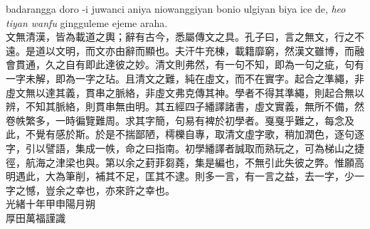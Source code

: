 \documentclass{article}
\begin{document}
\noindent badarangga doro -i juwanci aniya niowanggiyan bonio ulgiyan biya ice de, \emph{heo tiyan wanfu} gingguleme ejeme araha.\\

文無清漢，皆為載道之輿；辭有古今，悉屬傳文之具。孔子曰，言之無文，行之不遠。是道以文明，而文亦由辭而顯也。夫汗牛充棟，載籍靡窮，然漢文雖博，而融會貫通，久之自有即此達彼之妙。清文則弗然，有一句不知，即為一句之疵，句有一字未解，即為一字之玷。且清文之難，純在虛文，而不在實字。起合之準繩，非虛文無以達其義，貫串之脈絡，非虛文弗克傳其神。學者不得其準繩，則起合無以辨，不知其脈絡，則貫串無由明。其五經四子繙譯諸書，虛文實義，無所不備，然卷帙繁多，一時徧覽難周。求其字簡，句易有裨於初學者。戛戛乎難之，每念及此，不覺有感於斯。於是不揣鄙陋，樗櫟自專，取清文虛字歌，稍加潤色，逐句逐字，引以譬語，集成一帙，命之曰指南。初學繙譯者誠取而熟玩之，可為梯山之捷徑，航海之津梁也與。第以余之葑菲芻蕘，集是編也，不無引此失彼之弊。惟願高明遇此，大為筆削，補其不足，匡其不逮。則多一言，有一言之益，去一字，少一字之憾，豈余之幸也，亦來許之幸也。\\

\noindent 光緒十年甲申陽月朔\\
\noindent 厚田萬福謹識
\end{document}
